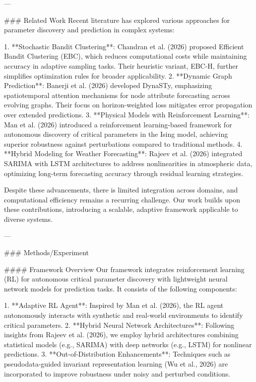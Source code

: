 ---

### Related Work  
Recent literature has explored various approaches for parameter discovery and prediction in complex systems:  

1. **Stochastic Bandit Clustering**: Chandran et al. (2026) proposed Efficient Bandit Clustering (EBC), which reduces computational costs while maintaining accuracy in adaptive sampling tasks. Their heuristic variant, EBC-H, further simplifies optimization rules for broader applicability.  
2. **Dynamic Graph Prediction**: Banerji et al. (2026) developed DynaSTy, emphasizing spatiotemporal attention mechanisms for node attribute forecasting across evolving graphs. Their focus on horizon-weighted loss mitigates error propagation over extended predictions.  
3. **Physical Models with Reinforcement Learning**: Man et al. (2026) introduced a reinforcement learning-based framework for autonomous discovery of critical parameters in the Ising model, achieving superior robustness against perturbations compared to traditional methods.  
4. **Hybrid Modeling for Weather Forecasting**: Rajeev et al. (2026) integrated SARIMA with LSTM architectures to address nonlinearities in atmospheric data, optimizing long-term forecasting accuracy through residual learning strategies.  

Despite these advancements, there is limited integration across domains, and computational efficiency remains a recurring challenge. Our work builds upon these contributions, introducing a scalable, adaptive framework applicable to diverse systems.

---

### Methods/Experiment  

#### Framework Overview  
Our framework integrates reinforcement learning (RL) for autonomous critical parameter discovery with lightweight neural network models for prediction tasks. It consists of the following components:  

1. **Adaptive RL Agent**: Inspired by Man et al. (2026), the RL agent autonomously interacts with synthetic and real-world environments to identify critical parameters.  
2. **Hybrid Neural Network Architectures**: Following insights from Rajeev et al. (2026), we employ hybrid architectures combining statistical models (e.g., SARIMA) with deep networks (e.g., LSTM) for nonlinear predictions.  
3. **Out-of-Distribution Enhancements**: Techniques such as pseudodata-guided invariant representation learning (Wu et al., 2026) are incorporated to improve robustness under noisy and perturbed conditions.  

